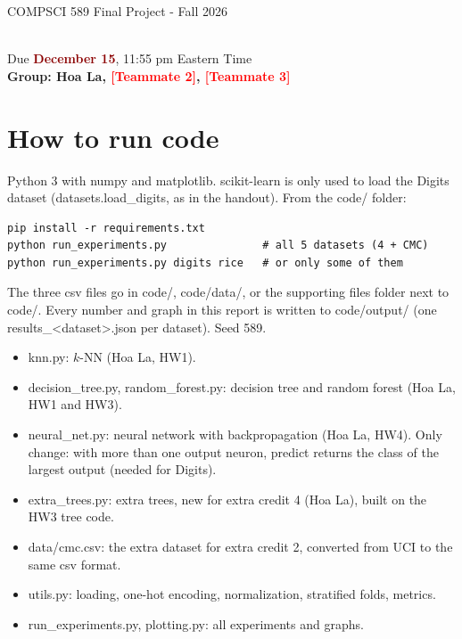 \documentclass{article}
\begin{document}
\vspace*{1cm}
\begin{center}
    \begin{Large}
    COMPSCI 589 Final Project - Fall 2026
    \end{Large}
    \\
    \vspace{0.15cm}
    Due \textcolor{darkred}{\textbf{December 15}}, 11:55 pm Eastern Time
    \\[0.35cm]
    \textbf{Group: Hoa La, \textcolor{red}{[Teammate 2]}, \textcolor{red}{[Teammate 3]}}
\end{center}

\vspace{0.5cm}
\section*{How to run code}

Python 3 with numpy and matplotlib. scikit-learn is only used to load the Digits dataset
(datasets.load\_digits, as in the handout). From the code/ folder:

\begin{verbatim}
pip install -r requirements.txt
python run_experiments.py               # all 5 datasets (4 + CMC)
python run_experiments.py digits rice   # or only some of them
\end{verbatim}

The three csv files go in code/, code/data/, or the supporting files folder next to code/. Every number
and graph in this report is written to code/output/ (one results\_<dataset>.json per dataset). Seed 589.

\begin{itemize}
\item knn.py: $k$-NN (Hoa La, HW1).
\item decision\_tree.py, random\_forest.py: decision tree and random forest (Hoa La, HW1 and HW3).
\item neural\_net.py: neural network with backpropagation (Hoa La, HW4). Only change: with more than one
output neuron, predict returns the class of the largest output (needed for Digits).
\item extra\_trees.py: extra trees, new for extra credit 4 (Hoa La), built on the HW3 tree code.
\item data/cmc.csv: the extra dataset for extra credit 2, converted from UCI to the same csv format.
\item utils.py: loading, one-hot encoding, normalization, stratified folds, metrics.
\item run\_experiments.py, plotting.py: all experiments and graphs.
\end{itemize}
\end{document}

